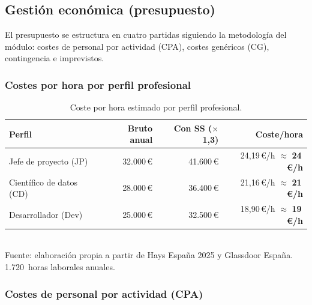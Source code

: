 \subsection{Gestión económica (presupuesto)}
\label{sec:gep-presupuesto}

El presupuesto se estructura en cuatro partidas siguiendo la
metodología del módulo: costes de personal por actividad (CPA),
costes genéricos (CG), contingencia e imprevistos.

\subsubsection{Costes por hora por perfil profesional}

\begin{table}[H]
\centering
\caption{Coste por hora estimado por perfil profesional.}
\label{tab:gep-perfiles}
\small
\begin{tabular}{@{}l r r r@{}}
\toprule
\textbf{Perfil} & \textbf{Bruto anual} & \textbf{Con SS ($\times$1,3)} & \textbf{Coste/hora} \\
\midrule
Jefe de proyecto (JP)    & 32.000\,\euro{} & 41.600\,\euro{} & 24,19\,\euro{}/h $\approx$ \textbf{24\,\euro{}/h} \\
Científico de datos (CD) & 28.000\,\euro{} & 36.400\,\euro{} & 21,16\,\euro{}/h $\approx$ \textbf{21\,\euro{}/h} \\
Desarrollador (Dev)      & 25.000\,\euro{} & 32.500\,\euro{} & 18,90\,\euro{}/h $\approx$ \textbf{19\,\euro{}/h} \\
\bottomrule
\end{tabular}
\\[0.15cm]{\small Fuente: elaboración propia a partir de Hays España 2025 y Glassdoor España. 1.720~horas laborales anuales.}
\end{table}

\subsubsection{Costes de personal por actividad (CPA)}

